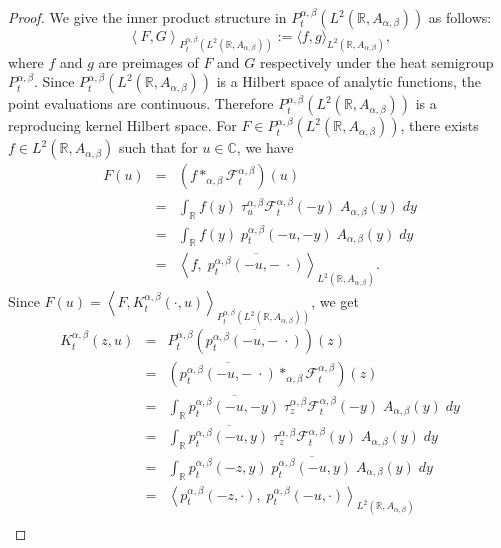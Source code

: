 \documentclass[a4paper,11pt, reqno]{amsart}
\theoremstyle{plain}
\theoremstyle{definition}
\theoremstyle{remark}
\def \R{{\mathbb R}}
\def \C{{\mathbb C}}
\def\R{\mathbb R}
\begin{document}
\begin{proof}
We give the inner product structure in $P^{\alpha, \beta}_t \left( L^2(\R, A_{\alpha, \beta}) \right)$ as follows: 
\[ \left\langle  F, G \right\rangle_{P^{\alpha, \beta}_t \left( L^2(\R, A_{\alpha, \beta}) \right)}:= \langle f , g \rangle_{L^2(\R, A_{\alpha, \beta})},  \]
where $f$ and $g$ are preimages of $F$ and $G$ respectively under the heat semigroup $P^{\alpha, \beta}_t$. Since $P^{\alpha, \beta}_t \left( L^2(\R, A_{\alpha, \beta}) \right)$ is a Hilbert space of analytic functions, the point evaluations are continuous. Therefore $P^{\alpha, \beta}_t \left( L^2(\R, A_{\alpha, \beta}) \right)$ is a reproducing kernel Hilbert space. For $F \in P^{\alpha, \beta}_t \left( L^2(\R, A_{\alpha, \beta}) \right)$, there exists $f \in L^2(\R, A_{\alpha, \beta})$ such that for $u \in \C$, we have
\begin{eqnarray*}
F(u) 
& = & \left( f *_{\alpha, \beta} \mathcal{F}_t^{\alpha, \beta} \right) (u)  \\
& = & \int_\R  f(y) \;\tau_u^{\alpha, \beta} \mathcal{F}_t^{\alpha, \beta}(-y) \; A_{\alpha, \beta}(y) \; dy \\
& = & \int_\R  f(y) \; p^{\alpha, \beta}_{t} (-u, -y) \; A_{\alpha, \beta}(y) \; dy \\
& = & \left\langle f, \; \overline{p^{\alpha, \beta}_{t} (-u, - \; \cdot)} \right\rangle_{L^2(\R, A_{\alpha, \beta})}.
\end{eqnarray*}
Since $F(u) = \left\langle F, K^{\alpha, \beta}_t (\cdot,u) \right\rangle_{P^{\alpha, \beta}_t \left( L^2(\R, A_{\alpha, \beta}) \right)}$, we get
\begin{eqnarray*}
K^{\alpha, \beta}_t (z,u)
& = & P^{\alpha, \beta}_t \left( \overline{p^{\alpha, \beta}_{t} (-u, - \; \cdot)} \right) (z) \\
& = & \left( \overline{p^{\alpha, \beta}_{t} (-u, - \; \cdot)} *_{\alpha, \beta} \mathcal{F}_t^{\alpha, \beta} \right) (z) \\
& = & \int_\R  \overline{p^{\alpha, \beta}_{t} (-u, - y)} \;\tau_z^{\alpha, \beta} \mathcal{F}_t^{\alpha, \beta}(-y) \; A_{\alpha, \beta}(y) \; dy \\
& = & \int_\R  \overline{p^{\alpha, \beta}_{t} (-u, y)} \;\tau_z^{\alpha, \beta} \mathcal{F}_t^{\alpha, \beta}(y) \; A_{\alpha, \beta}(y) \; dy \\
& = & \int_\R  p^{\alpha, \beta}_{t} (-z, y) \; \overline{p^{\alpha, \beta}_{t} (-u, y)} \; A_{\alpha, \beta}(y) \; dy \\
& = & \left\langle p^{\alpha, \beta}_{t} (-z, \cdot) , \;  p^{\alpha, \beta}_{t} (-u, \cdot) \right\rangle_{L^2(\R, A_{\alpha, \beta})} \\

\end{eqnarray*}
\end{proof}
\end{document}

